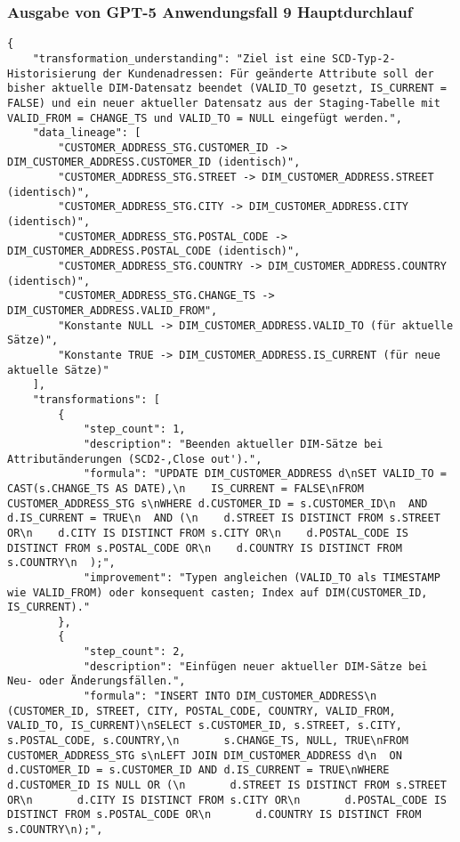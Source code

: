 \subsubsection{Ausgabe von GPT-5 Anwendungsfall 9 Hauptdurchlauf}\label{anhang:subsubsec:gpt_case9_prompt1}
\begin{lstlisting}[caption={Ausgabe: GPT-5 Anwendungsfall 9 Hauptdurchlauf},label={gpt_case9_prompt1}]
{
    "transformation_understanding": "Ziel ist eine SCD-Typ-2-Historisierung der Kundenadressen: Für geänderte Attribute soll der bisher aktuelle DIM-Datensatz beendet (VALID_TO gesetzt, IS_CURRENT = FALSE) und ein neuer aktueller Datensatz aus der Staging-Tabelle mit VALID_FROM = CHANGE_TS und VALID_TO = NULL eingefügt werden.",
    "data_lineage": [
        "CUSTOMER_ADDRESS_STG.CUSTOMER_ID -> DIM_CUSTOMER_ADDRESS.CUSTOMER_ID (identisch)",
        "CUSTOMER_ADDRESS_STG.STREET -> DIM_CUSTOMER_ADDRESS.STREET (identisch)",
        "CUSTOMER_ADDRESS_STG.CITY -> DIM_CUSTOMER_ADDRESS.CITY (identisch)",
        "CUSTOMER_ADDRESS_STG.POSTAL_CODE -> DIM_CUSTOMER_ADDRESS.POSTAL_CODE (identisch)",
        "CUSTOMER_ADDRESS_STG.COUNTRY -> DIM_CUSTOMER_ADDRESS.COUNTRY (identisch)",
        "CUSTOMER_ADDRESS_STG.CHANGE_TS -> DIM_CUSTOMER_ADDRESS.VALID_FROM",
        "Konstante NULL -> DIM_CUSTOMER_ADDRESS.VALID_TO (für aktuelle Sätze)",
        "Konstante TRUE -> DIM_CUSTOMER_ADDRESS.IS_CURRENT (für neue aktuelle Sätze)"
    ],
    "transformations": [
        {
            "step_count": 1,
            "description": "Beenden aktueller DIM-Sätze bei Attributänderungen (SCD2-,Close out').",
            "formula": "UPDATE DIM_CUSTOMER_ADDRESS d\nSET VALID_TO = CAST(s.CHANGE_TS AS DATE),\n    IS_CURRENT = FALSE\nFROM CUSTOMER_ADDRESS_STG s\nWHERE d.CUSTOMER_ID = s.CUSTOMER_ID\n  AND d.IS_CURRENT = TRUE\n  AND (\n    d.STREET IS DISTINCT FROM s.STREET OR\n    d.CITY IS DISTINCT FROM s.CITY OR\n    d.POSTAL_CODE IS DISTINCT FROM s.POSTAL_CODE OR\n    d.COUNTRY IS DISTINCT FROM s.COUNTRY\n  );",
            "improvement": "Typen angleichen (VALID_TO als TIMESTAMP wie VALID_FROM) oder konsequent casten; Index auf DIM(CUSTOMER_ID, IS_CURRENT)."
        },
        {
            "step_count": 2,
            "description": "Einfügen neuer aktueller DIM-Sätze bei Neu- oder Änderungsfällen.",
            "formula": "INSERT INTO DIM_CUSTOMER_ADDRESS\n  (CUSTOMER_ID, STREET, CITY, POSTAL_CODE, COUNTRY, VALID_FROM, VALID_TO, IS_CURRENT)\nSELECT s.CUSTOMER_ID, s.STREET, s.CITY, s.POSTAL_CODE, s.COUNTRY,\n       s.CHANGE_TS, NULL, TRUE\nFROM CUSTOMER_ADDRESS_STG s\nLEFT JOIN DIM_CUSTOMER_ADDRESS d\n  ON d.CUSTOMER_ID = s.CUSTOMER_ID AND d.IS_CURRENT = TRUE\nWHERE d.CUSTOMER_ID IS NULL OR (\n       d.STREET IS DISTINCT FROM s.STREET OR\n       d.CITY IS DISTINCT FROM s.CITY OR\n       d.POSTAL_CODE IS DISTINCT FROM s.POSTAL_CODE OR\n       d.COUNTRY IS DISTINCT FROM s.COUNTRY\n);",

\end{lstlisting}
